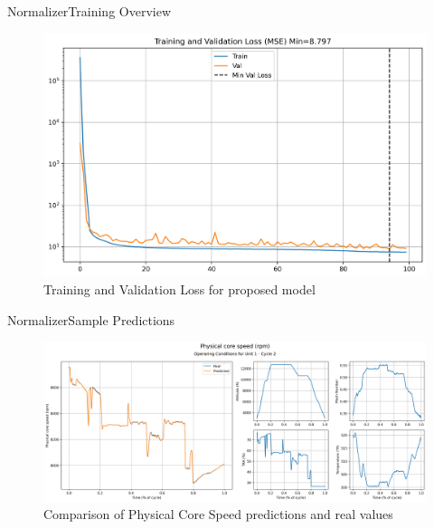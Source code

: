 \documentclass{beamer}
\begin{document}
        \begin{frame}{Normalizer}{Training Overview}
            \begin{figure}[!htbp]
                \centering
                \includegraphics[scale=0.45]{train_val_loss_show.png}
                \caption{Training and Validation Loss for proposed model}
            \end{figure}
        \end{frame}

        \begin{frame}{Normalizer}{Sample Predictions}
            \begin{figure}[!htbp]
                \centering
                \includegraphics[scale=0.27]{Nc_cycle_2_pred_op_conditions.png}
                \caption{Comparison of Physical Core Speed predictions and real values}
            \end{figure}
        \end{frame}
\end{document}
